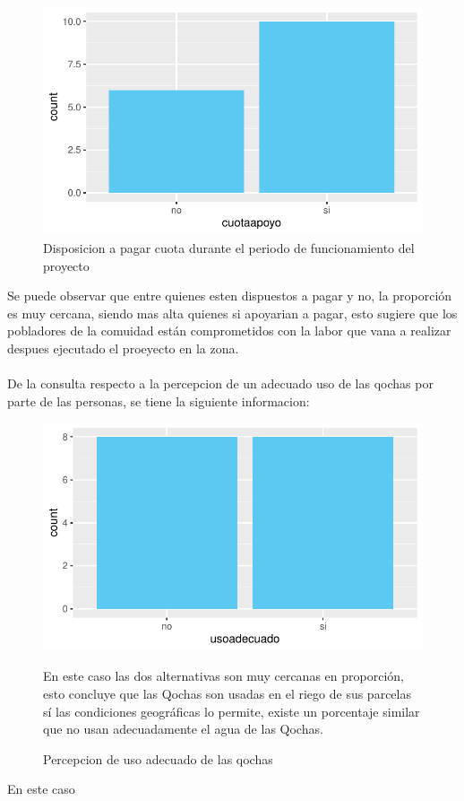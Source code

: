 \documentclass[12pt]{article}\usepackage[]{graphicx}\usepackage[]{xcolor}
\makeatletter
\def\maxwidth{ %
  \ifdim\Gin@nat@width>\linewidth
    \linewidth
  \else
    \Gin@nat@width
  \fi
}
\newenvironment{knitrout}{}{} %
\makeatother
\begin{document}
	\begin{figure}[H]
	\centering
\begin{knitrout}
\color{fgcolor}
\includegraphics[width=\maxwidth]{figure/veintiocho-1} 
\end{knitrout}
	\caption{Disposicion a pagar cuota durante el periodo de funcionamiento del proyecto}
	\end{figure}
	Se puede observar que entre quienes esten dispuestos a pagar y no, la proporción es muy cercana, siendo mas alta quienes si apoyarian a pagar, esto sugiere que los pobladores de la comuidad están comprometidos con la labor que vana a realizar despues ejecutado el proeyecto en la zona.\\
	\\
	De la consulta respecto a la percepcion de un adecuado uso de las qochas por parte de las personas, se tiene la siguiente informacion:
	\begin{figure}[H]
	\centering
\begin{knitrout}
\color{fgcolor}
\includegraphics[width=\maxwidth]{figure/veintinueve-1} 
\end{knitrout}
	\caption{Percepcion de uso adecuado de las qochas}
	En este caso las dos alternativas son muy cercanas en proporción, esto concluye que las Qochas son usadas en el riego de sus parcelas sí las condiciones geográficas lo permite, existe un porcentaje similar que no usan adecuadamente el agua de las Qochas.
	\end{figure}
	En este caso 
\end{document}
